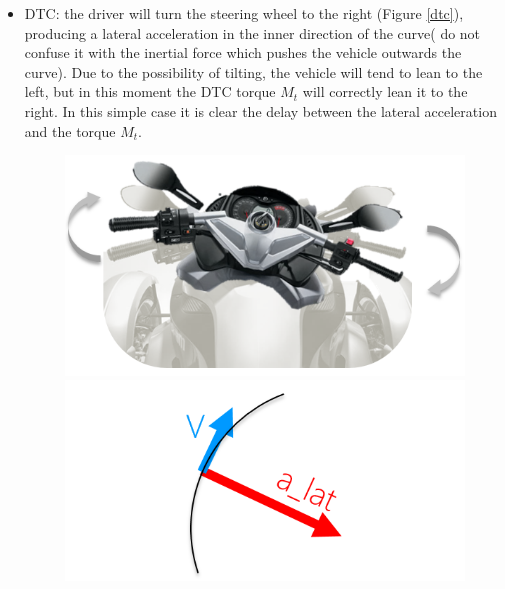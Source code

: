 	
\begin{itemize}
	\begin{itemize}
	\item DTC: the driver will turn the steering wheel to the right (Figure \ref{dtc}), producing a lateral acceleration in the inner direction of the curve( do not confuse it with the inertial force which pushes the vehicle outwards the curve). Due to the possibility of tilting, the vehicle will tend to lean to the left, but in this moment the DTC torque $M_t$ will correctly lean it to the right. In this simple case it is clear the delay between the lateral acceleration and the torque $M_t$.
	\begin{figure}[h]
		  \includegraphics[width=1.0\linewidth]{figs/02/dtc_1}
		\endminipage\hfill
		  \includegraphics[width=1.2\linewidth]{figs/02/dtc_2}
		\endminipage\hfill

\end{figure}
\end{itemize}
\end{itemize}
